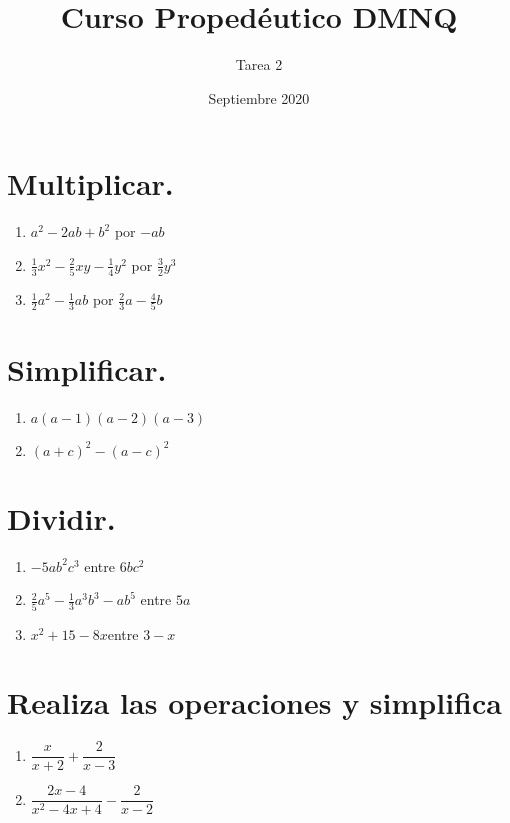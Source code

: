 \documentclass{article}
\title{Curso Propedéutico DMNQ}
\author{Tarea 2}
\date{Septiembre 2020}
\begin{document}
\maketitle

\section*{Multiplicar.}
\begin{enumerate}
    \item $a^2 - 2ab + b^2$ por $-ab$
    \item $\frac{1}{3}x^2 - \frac{2}{5}xy - \frac{1}{4}y^2$ por $\frac{3}{2} y^3$
    \item $\frac{1}{2}a^2 - \frac{1}{3}ab$ por $\frac{2}{3}a - \frac{4}{5}b$
\end{enumerate}

\section*{Simplificar.}

\begin{enumerate}
    \item$ a(a - 1)(a - 2)(a - 3)$
    \item $(a + c)^2 - (a - c)^2$
\end{enumerate}

\section*{Dividir.}

\begin{enumerate}
    \item $-5ab^2c^3$ entre $6bc^2$
    \item $\frac{2}{5}a^5 - \frac{1}{3}a^3b^3 - ab^5$ entre $5a$
    \item $x^2 + 15 - 8x $entre $3 - x$
\end{enumerate}

\section*{Realiza las operaciones y simplifica}

\begin{enumerate}
    \item $\dfrac{x}{x+2} + \dfrac{2}{x-3}$
    \item $\dfrac{2x - 4}{x^2 - 4x + 4}-\dfrac{2}{x - 2}$
\end{enumerate}
\end{document}
